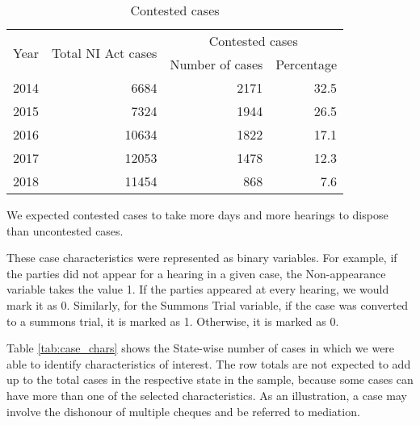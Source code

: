 \begin{description}
\begin{longtable}{@{}lrrr@{}}
 \caption{Contested cases}\label{tab:cont_yearWise}\\
\toprule
\multirow{2}{*}{Year} & \multirow{2}{*}{Total NI Act cases} & \multicolumn{2}{c}{Contested cases}\\
\cmidrule{3-4}
&& Number of cases & Percentage \\
\midrule\endhead
2014 & 6684 & 2171 & 32.5 \\
2015 & 7324 & 1944 & 26.5 \\
2016 & 10634 & 1822 & 17.1 \\
2017 & 12053 & 1478 & 12.3 \\
2018 & 11454 & 868 & 7.6 \\
\bottomrule
\end{longtable}

We expected contested cases to take more days and more hearings to dispose than uncontested cases.

\item[]

\end{description}

These case characteristics were represented as binary variables. For example, if the parties did not appear for a hearing in a given case, the Non-appearance variable takes the value 1. If the parties appeared at every hearing, we would mark it as 0. Similarly, for the Summons Trial variable, if the case was converted to a summons trial, it is marked as 1. Otherwise, it is marked as 0.


Table \ref{tab:case_chars} shows the State-wise number of cases in which we were able to identify characteristics of interest. The row totals are not expected to add up to the total cases in the respective state in the sample, because some cases can have more than one of the selected characteristics. As an illustration, a case may involve the dishonour of multiple cheques and be referred to mediation.


